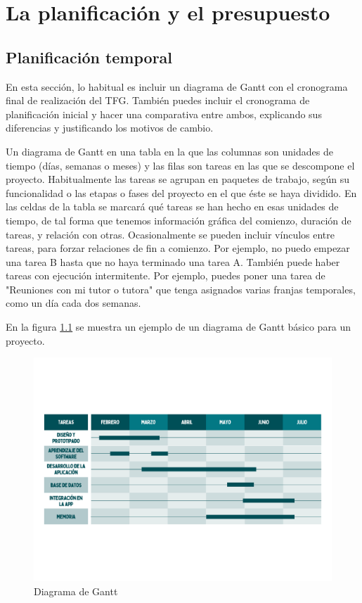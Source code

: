 \chapter{La planificación y el presupuesto}
\label{cap:PlanificacionPresupuesto}

\section{Planificación temporal}
En esta sección, lo habitual es incluir un diagrama de Gantt con el cronograma final de realización del TFG. También puedes incluir el cronograma de planificación inicial y hacer una comparativa entre ambos, explicando sus diferencias y justificando los motivos de cambio.

Un diagrama de Gantt en una tabla en la que las columnas son unidades de tiempo (días, semanas o meses) y las filas son tareas en las que se descompone el proyecto. Habitualmente las tareas se agrupan en paquetes de trabajo, según su funcionalidad o las etapas o fases del proyecto en el que éste se haya dividido. En las celdas de la tabla se marcará qué tareas se han hecho en esas unidades de tiempo, de tal forma que tenemos información gráfica del comienzo, duración de tareas, y relación con otras. Ocasionalmente se pueden incluir vínculos entre tareas, para forzar relaciones de fin a comienzo. Por ejemplo, no puedo empezar una tarea B hasta que no haya terminado una tarea A. También puede haber tareas con ejecución intermitente. Por ejemplo, puedes poner una tarea de "Reuniones con mi tutor o tutora" que tenga asignados varias franjas temporales, como un día cada dos semanas.

En la figura \ref{fig:gantt} se muestra un ejemplo de un diagrama de Gantt básico para un proyecto.

\begin{figure}[!t]
    \centering
    \includegraphics[width=.8\textwidth]{images/EjemploGantt.pdf}
    \caption{Diagrama de Gantt\label{fig:gantt}}
\end{figure}

